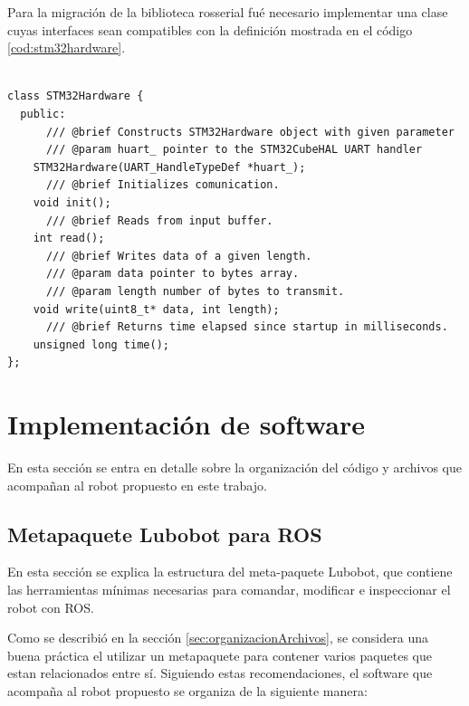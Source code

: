 Para la migración de la biblioteca rosserial fué necesario implementar una clase cuyas interfaces sean compatibles con la definición mostrada en el código \ref{cod:stm32hardware}.

\begin{lstlisting}[label=cod:stm32hardware, caption=Interfaz de la clase STM32Hardware requerida por la biblioteca rosserial.\protect\footnotemark]

class STM32Hardware {
  public:
	  /// @brief Constructs STM32Hardware object with given parameter
	  /// @param huart_ pointer to the STM32CubeHAL UART handler
    STM32Hardware(UART_HandleTypeDef *huart_);
	  /// @brief Initializes comunication.
    void init();
	  /// @brief Reads from input buffer.
    int read();
	  /// @brief Writes data of a given length.
	  /// @param data pointer to bytes array.
	  /// @param length number of bytes to transmit.
    void write(uint8_t* data, int length);
	  /// @brief Returns time elapsed since startup in milliseconds.
    unsigned long time();
};

\end{lstlisting}


\section{Implementación de software}

En esta sección se entra en detalle sobre la organización del código y archivos que acompañan al robot propuesto en este trabajo.

\subsection{Metapaquete Lubobot para ROS}

En esta sección se explica la estructura del meta-paquete Lubobot, que contiene las herramientas mínimas necesarias para comandar, modificar e inspeccionar el robot con ROS.

Como se describió en la sección \ref{sec:organizacionArchivos}, se considera una buena práctica el utilizar un metapaquete para contener varios paquetes que estan relacionados entre sí. Siguiendo estas recomendaciones, el software que acompaña al robot propuesto se organiza de la siguiente manera:

